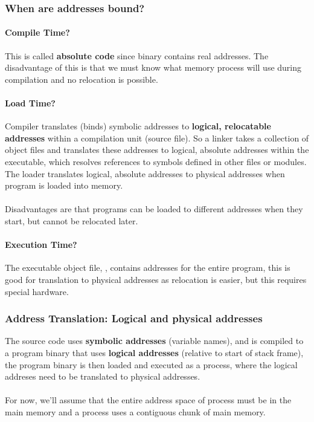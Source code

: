 \documentclass{article}
\begin{document}
\subsubsection{When are addresses bound?}

\paragraph{Compile Time?} This is called \textbf{absolute code} since binary contains real addresses. The disadvantage of this is that we must know what memory process will use during compilation and no relocation is possible.

\paragraph{Load Time?} Compiler translates (binds) symbolic addresses to \textbf{logical, relocatable addresses} within a compilation unit (source file). So a linker takes a collection of object files and translates these addresses to logical, absolute addresses within the executable, which resolves references to symbols defined in other files or modules. The loader translates logical, absolute addresses to physical addresses when program is loaded into memory.\\
\\
Disadvantages are that programs can be loaded to different addresses when they start, but cannot be relocated later.

\paragraph{Execution Time?} The executable object file, , contains addresses for the entire program, this is good for translation to physical addresses as relocation is easier, but this requires special hardware.

\subsubsection{Address Translation: Logical and physical addresses}

The source code uses \textbf{symbolic addresses} (variable names), and is compiled to a program binary that uses \textbf{logical addresses} (relative to start of stack frame), the program binary is then loaded and executed as a process, where the logical addreses need to be translated to physical addresses.\\
\\
For now, we'll assume that the entire address space of process must be in the main memory and a process uses a contiguous chunk of main memory.
\end{document}
